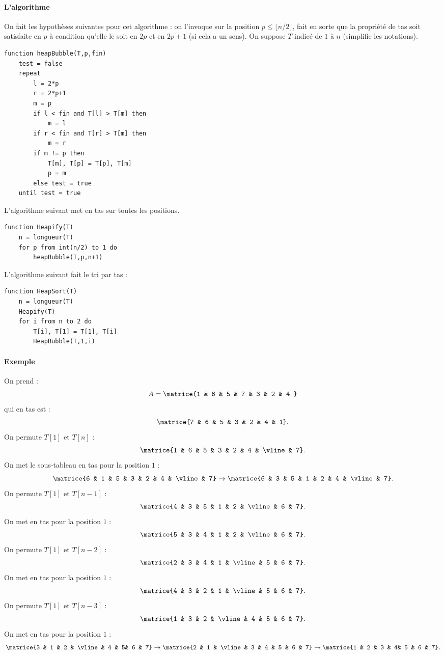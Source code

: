 \documentclass{mybourbaki}
\begin{document}
\paragraph{L'algorithme}On fait les hypothèses suivantes pour cet algorithme : on l'invoque sur la position $p\leq \lfloor n/2\rfloor$, fait en sorte que la propriété de tas soit satisfaite en $p$ à condition qu'elle le soit en $2p$ et en $2p+1$ (si cela a un sens). On suppose $T$ indicé de $1$ à $n$ (simplifie les notations).
\begin{lstlisting}
function heapBubble(T,p,fin)
	test = false
	repeat
		l = 2*p
		r = 2*p+1
		m = p
		if l < fin and T[l] > T[m] then
			m = l
		if r < fin and T[r] > T[m] then
			m = r
		if m != p then
			T[m], T[p] = T[p], T[m]
			p = m
		else test = true
	until test = true			 	
\end{lstlisting}
L'algorithme suivant met en tas sur toutes les positions.
\begin{lstlisting}
function Heapify(T)
	n = longueur(T)
	for p from int(n/2) to 1 do
		heapBubble(T,p,n+1)
\end{lstlisting} 
 
L'algorithme suivant fait le tri par tas :
\begin{lstlisting}
function HeapSort(T)
	n = longueur(T)
	Heapify(T)
	for i from n to 2 do
		T[i], T[1] = T[1], T[i]
		HeapBubble(T,1,i)
\end{lstlisting} 
 
\paragraph{Exemple}On prend : \[ A = \matrice{1 & 6 & 5 & 7 & 3 & 2 & 4 }\] qui en tas est : \[\matrice{7 & 6 & 5 & 3 & 2 & 4 & 1}.\]On permute $T[1]$ et $T[n]$ : \[ \matrice{1 & 6 & 5 & 3 & 2 & 4 & \vline & 7}.\]On met le sous-tableau en tas pour la position $1$ : \[ \matrice{6 & 1 & 5 & 3 & 2 & 4 & \vline & 7} \to\matrice{6 & 3 & 5 & 1 & 2 & 4 & \vline & 7}.\]On permute $T[1]$ et $T[n-1]$ : \[ \matrice{4 & 3 & 5 & 1 & 2 & \vline & 6 & 7}.\]On met en tas pour la position $1$ : \[ \matrice{5 & 3 & 4 & 1 & 2 & \vline & 6 & 7}.\]On permute $T[1]$ et $T[n-2]$ : \[ \matrice{2 & 3 & 4 & 1 & \vline & 5 & 6 & 7}. \]On met en tas pour la position $1$ : \[ \matrice{4 & 3 & 2 & 1 & \vline & 5 & 6 & 7}.\]On permute $T[1]$ et $T[n-3]$ : \[ \matrice{1 & 3 & 2 & \vline & 4 & 5 & 6 & 7}. \]On met en tas pour la position $1$ : \[\matrice{3 & 1 & 2 & \vline & 4 & 5& 6 & 7} \to \matrice{2 & 1 & \vline & 3 & 4 & 5 & 6 & 7} \to \matrice{1 & 2 & 3 & 4& 5 & 6 & 7}. \]
 
\end{document}
